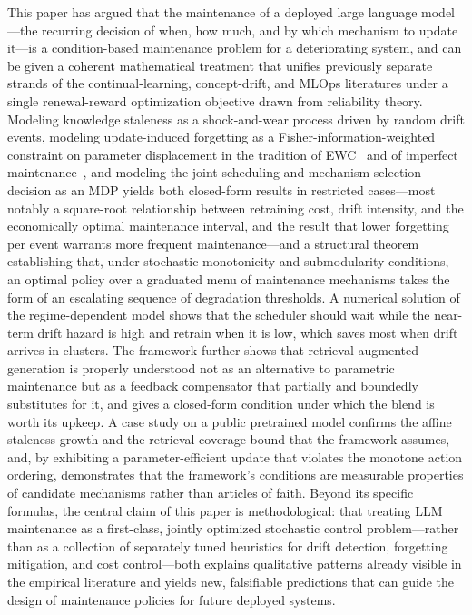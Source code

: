\documentclass[electronics,article,submit,pdftex,moreauthors]{Definitions/mdpi}
\begin{document}
This paper has argued that the maintenance of a deployed large language model---the recurring decision of when, how much, and by which mechanism to update it---is a condition-based maintenance problem for a deteriorating system, and can be given a coherent mathematical treatment that unifies previously separate strands of the continual-learning, concept-drift, and MLOps literatures under a single renewal-reward optimization objective drawn from reliability theory. Modeling knowledge staleness as a shock-and-wear process driven by random drift events, modeling update-induced forgetting as a Fisher-information-weighted constraint on parameter displacement in the tradition of EWC~\cite{Kirkpatrick2017} and of imperfect maintenance~\cite{Pham1996}, and modeling the joint scheduling and mechanism-selection decision as an MDP yields both closed-form results in restricted cases---most notably a square-root relationship between retraining cost, drift intensity, and the economically optimal maintenance interval, and the result that lower forgetting per event warrants more frequent maintenance---and a structural theorem establishing that, under stochastic-monotonicity and submodularity conditions, an optimal policy over a graduated menu of maintenance mechanisms takes the form of an escalating sequence of degradation thresholds. A numerical solution of the regime-dependent model shows that the scheduler should wait while the near-term drift hazard is high and retrain when it is low, which saves most when drift arrives in clusters. The framework further shows that retrieval-augmented generation is properly understood not as an alternative to parametric maintenance but as a feedback compensator that partially and boundedly substitutes for it, and gives a closed-form condition under which the blend is worth its upkeep. A case study on a public pretrained model confirms the affine staleness growth and the retrieval-coverage bound that the framework assumes, and, by exhibiting a parameter-efficient update that violates the monotone action ordering, demonstrates that the framework's conditions are measurable properties of candidate mechanisms rather than articles of faith. Beyond its specific formulas, the central claim of this paper is methodological: that treating LLM maintenance as a first-class, jointly optimized stochastic control problem---rather than as a collection of separately tuned heuristics for drift detection, forgetting mitigation, and cost control---both explains qualitative patterns already visible in the empirical literature and yields new, falsifiable predictions that can guide the design of maintenance policies for future deployed systems.
\end{document}

